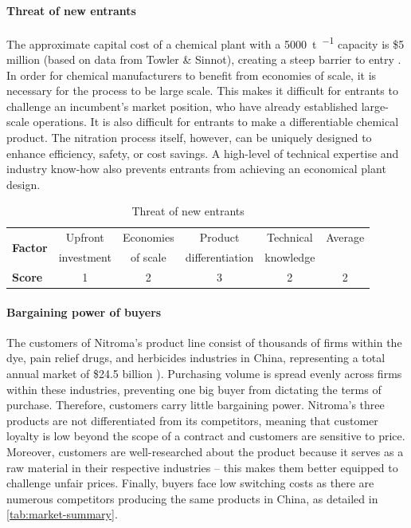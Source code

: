 \paragraph{Threat of new entrants}
The approximate capital cost of a chemical plant with a \SI{5000}{\tonne\per\year} capacity is \$5 million (based on data from Towler \& Sinnot), creating a steep barrier to entry \cite{sinnott_chemical_2020}. In order for chemical manufacturers to benefit from economies of scale, it is necessary for the process to be large scale. This makes it difficult for entrants to challenge an incumbent’s market position, who have already established large-scale operations. It is also difficult for entrants to make a differentiable chemical product. The nitration process itself, however, can be uniquely designed to enhance efficiency, safety, or cost savings. A high-level of technical expertise and industry know-how also prevents entrants from achieving an economical plant design. 
\begin{table}[H]
\centering
\caption{Threat of new entrants}
\label{tab:new-entrants}
\begin{tabular}{lccccc}
\toprule
\multirow{2}{*}{\textbf{Factor}} & Upfront    & Economies & Product         & Technical & Average \\
                                 & investment & of scale  & differentiation & knowledge &         \\\midrule
\textbf{Score}                   & 1          & 2         & 3               & 2         & \cellcolor{green}2      \\\bottomrule
\end{tabular}%
\end{table}

\paragraph{Bargaining power of buyers}
The customers of Nitroma’s product line consist of thousands of firms within the dye, pain relief drugs, and herbicides industries in China, representing a total annual market of \$24.5 billion \cite{mordor_intelligence_china_2018,ken_research_china_2020,bhardwa_topical_2021}). Purchasing volume is spread evenly across firms within these industries, preventing one big buyer from dictating the terms of purchase. Therefore, customers carry little bargaining power. Nitroma’s three products are not differentiated from its competitors, meaning that customer loyalty is low beyond the scope of a contract and customers are sensitive to price. Moreover, customers are well-researched about the product because it serves as a raw material in their respective industries – this makes them better equipped to challenge unfair prices. Finally, buyers face low switching costs as there are numerous competitors producing the same products in China, as detailed in 
\cref{tab:market-summary}.

